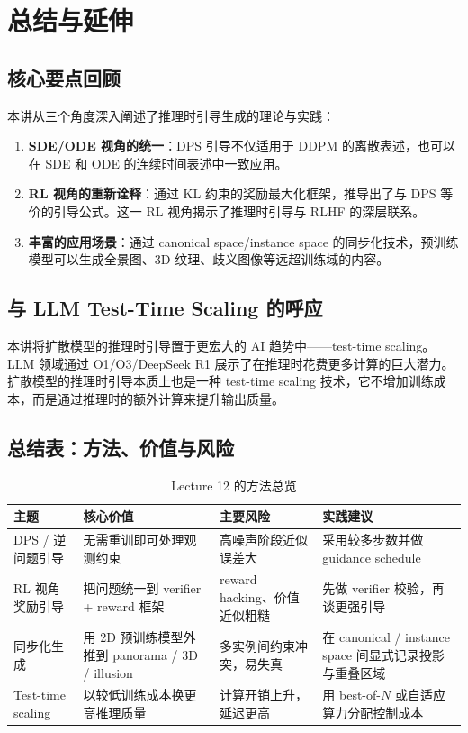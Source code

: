 \section{总结与延伸}

\subsection{核心要点回顾}

本讲从三个角度深入阐述了推理时引导生成的理论与实践：

\begin{enumerate}
    \item \textbf{SDE/ODE 视角的统一}：DPS 引导不仅适用于 DDPM 的离散表述，也可以在 SDE 和 ODE 的连续时间表述中一致应用。
    \item \textbf{RL 视角的重新诠释}：通过 KL 约束的奖励最大化框架，推导出了与 DPS 等价的引导公式。这一 RL 视角揭示了推理时引导与 RLHF 的深层联系。
    \item \textbf{丰富的应用场景}：通过 canonical space/instance space 的同步化技术，预训练模型可以生成全景图、3D 纹理、歧义图像等远超训练域的内容。
\end{enumerate}

\subsection{与 LLM Test-Time Scaling 的呼应}

本讲将扩散模型的推理时引导置于更宏大的 AI 趋势中——test-time scaling。LLM 领域通过 O1/O3/DeepSeek R1 展示了在推理时花费更多计算的巨大潜力。扩散模型的推理时引导本质上也是一种 test-time scaling 技术，它不增加训练成本，而是通过推理时的额外计算来提升输出质量。

\subsection{总结表：方法、价值与风险}

\begin{table}[H]
\centering
\begin{tabular}{p{} p{} p{} p{}}
\toprule
主题 & 核心价值 & 主要风险 & 实践建议 \\
\midrule
DPS / 逆问题引导 & 无需重训即可处理观测约束 & 高噪声阶段近似误差大 & 采用较多步数并做 guidance schedule \\
RL 视角奖励引导 & 把问题统一到 verifier + reward 框架 & reward hacking、价值近似粗糙 & 先做 verifier 校验，再谈更强引导 \\
同步化生成 & 用 2D 预训练模型外推到 panorama / 3D / illusion & 多实例间约束冲突，易失真 & 在 canonical / instance space 间显式记录投影与重叠区域 \\
Test-time scaling & 以较低训练成本换更高推理质量 & 计算开销上升，延迟更高 & 用 best-of-$N$ 或自适应算力分配控制成本 \\
\bottomrule
\end{tabular}
\caption{Lecture 12 的方法总览}
\end{table}

